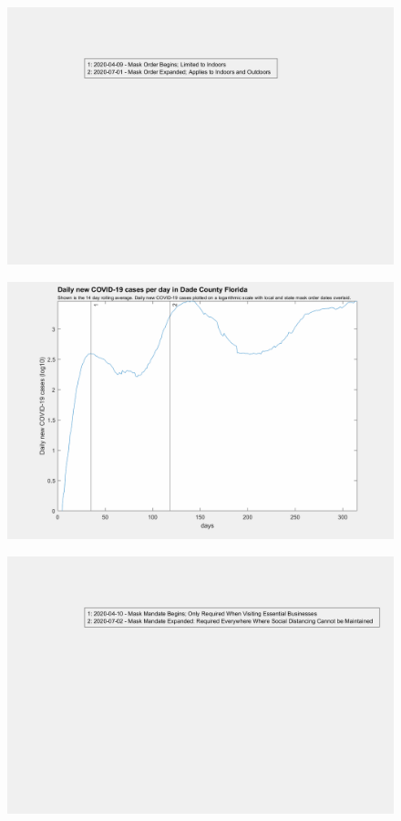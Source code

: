 \documentclass[]{article}
\begin{document}
\begin{figure}[!h]
	\includegraphics[width=\linewidth]{legends/dade_mask_order_legend.png}
	\caption{}
	\label{fig:legends/dade_mask_order_legendLabel}
\end{figure}

\begin{figure}[!h]
	\includegraphics[width=\linewidth]{images/dade_mask_order_log.png}
	\caption{}
	\label{fig:images/dade_mask_order_logLabel}
\end{figure}

\begin{figure}[!h]
	\includegraphics[width=\linewidth]{legends/broward_mask_order_legend.png}
	\caption{}
	\label{fig:legends/broward_mask_order_legendLabel}
\end{figure}
\end{document}
